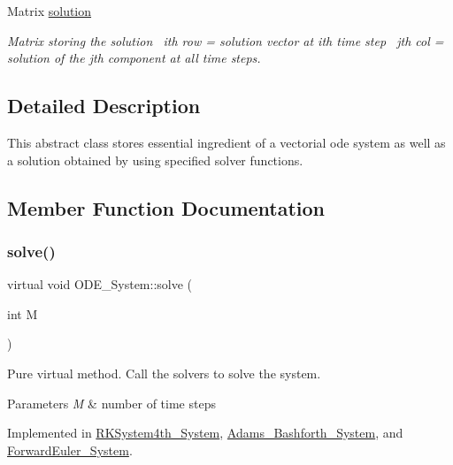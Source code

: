 \begin{DoxyCompactItemize}
\mbox{\label{class_o_d_e___system_ab2504680346a353e353f147f1ad9c51d}} 
Matrix \mbox{\hyperlink{class_o_d_e___system_ab2504680346a353e353f147f1ad9c51d}{solution}}
\begin{DoxyCompactList}\small\item\em Matrix storing the solution~\newline
ith row = solution vector at ith time step~\newline
jth col = solution of the jth component at all time steps. \end{DoxyCompactList}\end{DoxyCompactItemize}


\subsection{Detailed Description}
This abstract class stores essential ingredient of a vectorial ode system as well as a solution obtained by using specified solver functions. 

\subsection{Member Function Documentation}
\mbox{\label{class_o_d_e___system_a5fe78282ecf67d851f1a2363a028e6dd}} 
\subsubsection{\texorpdfstring{solve()}{solve()}}
{\footnotesize\ttfamily virtual void O\+D\+E\+\_\+\+System\+::solve (\begin{DoxyParamCaption}\item[{int}]{M }\end{DoxyParamCaption})\hspace{0.3cm}{\ttfamily [pure virtual]}}



Pure virtual method. Call the solvers to solve the system. 


\begin{DoxyParams}{Parameters}
{\em M} & number of time steps \\
\hline
\end{DoxyParams}


Implemented in \mbox{\hyperlink{class_r_k_system4th___system_ae36715c58bf1afc191394185f36eb611}{R\+K\+System4th\+\_\+\+System}}, \mbox{\hyperlink{class_adams___bashforth___system_acaf33d4f9f715a20a106f9029135cfe6}{Adams\+\_\+\+Bashforth\+\_\+\+System}}, and \mbox{\hyperlink{class_forward_euler___system_a52532a83a016d8478a7c458881b214b4}{Forward\+Euler\+\_\+\+System}}.


